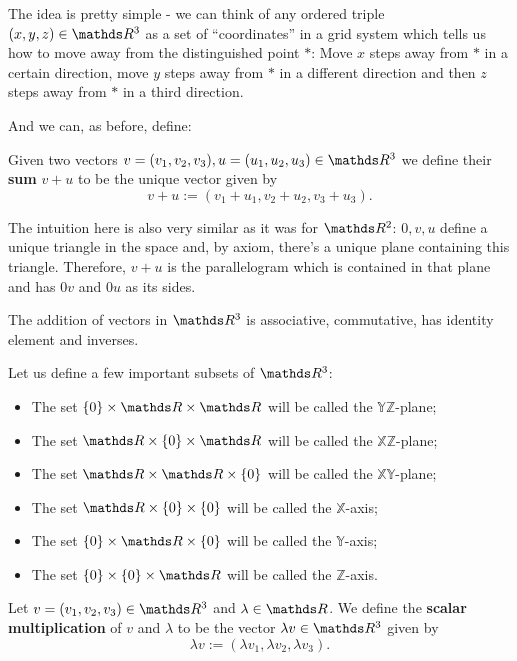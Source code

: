 The idea is pretty simple - we can think of any ordered triple $(x,y,z)\in \R^3$ as a set of ``coordinates'' in a grid system which tells us how to move away from the distinguished point $*$: Move $x$ steps away from $*$ in a certain direction, move $y$ steps away from $*$ in a different direction and then $z$ steps away from $*$ in a third direction.

And we can, as before, define:

\begin{df}
	Given two vectors $v=(v_1,v_2,v_3),u=(u_1,u_2,u_3)\in \R^3$ we define their \textbf{sum} $v+u$ to be the unique vector given by
	\[v+u:=(v_1+u_1,v_2+u_2,v_3+u_3).\]
\end{df}

The intuition here is also very similar as it was for $\R^2$: $0,v,u$ define a unique triangle in the space and, by axiom, there's a unique plane containing this triangle. Therefore, $v+u$ is the parallelogram which is contained in that plane and has $0v$ and $0u$ as its sides.

\begin{prop}
	The addition of vectors in $\R^3$ is associative, commutative, has identity element and inverses.
\end{prop}

\begin{df}
	Let us define a few important subsets of $\R^3$:
	\begin{itemize}
		\item The set $\{0\}\times \R\times \R$ will be called the $\mathds{YZ}$-plane;
		\item The set $\R\times\{0\}\times \R$ will be called the $\mathds{XZ}$-plane;
		\item The set $\R\times \R\times \{0\}$ will be called the $\mathds{XY}$-plane;
		\item The set $\R\times\{0\}\times \{0\}$ will be called the $\mathds{X}$-axis;
		\item The set $\{0\}\times \R\times\{0\}$ will be called the $\mathds{Y}$-axis;
		\item The set $\{0\}\times\{0\}\times \R$ will be called the $\mathds{Z}$-axis.
	\end{itemize}
\end{df}

\begin{df}
	Let $v=(v_1,v_2,v_3)\in \R^3$ and $\lambda\in \R$. We define the \textbf{scalar multiplication} of $v$ and $\lambda$ to be the vector $\lambda v\in\R^3$ given by
	\[\lambda v:=(\lambda v_1,\lambda v_2,\lambda v_3).\]
\end{df}

